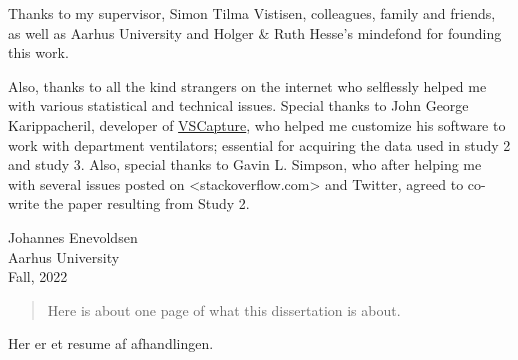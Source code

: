 \documentclass[a4paper, nobind]{templates/ociamthesis}
\begin{document}
\begin{romanpages}


\begin{acknowledgements}
 	Thanks to my supervisor, Simon Tilma Vistisen, colleagues, family and friends, as well as Aarhus University and Holger \& Ruth Hesse's mindefond for founding this work.

  Also, thanks to all the kind strangers on the internet who selflessly helped me with various statistical and technical issues. Special thanks to John George Karippacheril, developer of \href{https://www.ncbi.nlm.nih.gov/pmc/articles/PMC3788264/}{VSCapture}, who helped me customize his software to work with department ventilators; essential for acquiring the data used in study 2 and study 3. Also, special thanks to Gavin L. Simpson, who after helping me with several issues posted on \textless stackoverflow.com\textgreater{} and Twitter, agreed to co-write the paper resulting from Study 2.

  \begin{flushright}
  Johannes Enevoldsen \\
  Aarhus University \\
  Fall, 2022
  \end{flushright}
\end{acknowledgements}





\renewcommand{\abstracttitle}{Abstract}
\begin{abstract}
	Here is about one page of what this dissertation is about.
\end{abstract}




\renewcommand{\abstractsecondtitle}{Dansk Resumé}
\begin{abstractsecond}
	Her er et resume af afhandlingen.
\end{abstractsecond}


  \dominitoc %

\flushbottom

\tableofcontents


\end{romanpages}
\end{document}
